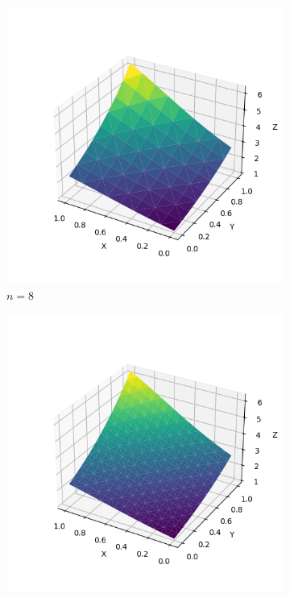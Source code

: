 \documentclass[lang=cn,a4paper,newtx,bibend=bibtex]{elegantpaper}
\begin{document}
\begin{figure}[H]
  \centering
  \begin{subfigure}[b]{0.18\textwidth}
      \includegraphics[width=\textwidth]{../../res_bac/res-[data|1-Dirichlet-regular-a8].png}
      \caption{$n =  8$}
  \end{subfigure}
  \hfill
  \begin{subfigure}[b]{0.18\textwidth}
      \includegraphics[width=\textwidth]{../../res_bac/res-[data|1-Dirichlet-regular-b16].png}

\end{subfigure}
\end{figure}
\end{document}
